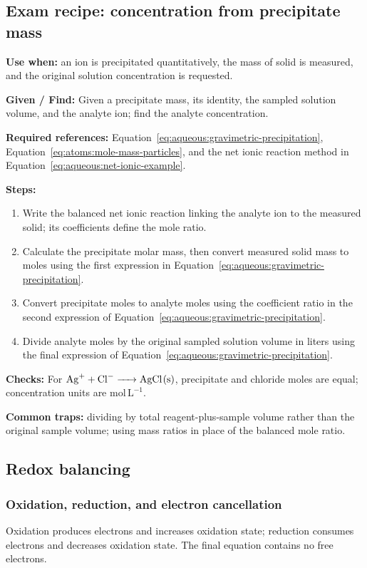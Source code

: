 \subsection{Exam recipe: concentration from precipitate mass}
\textbf{Use when:} an ion is precipitated quantitatively, the mass of solid is measured, and the original solution concentration is requested.

\textbf{Given / Find:} Given a precipitate mass, its identity, the sampled solution volume, and the analyte ion; find the analyte concentration.

\textbf{Required references:} Equation~\eqref{eq:aqueous:gravimetric-precipitation}, Equation~\eqref{eq:atoms:mole-mass-particles}, and the net ionic reaction method in Equation~\eqref{eq:aqueous:net-ionic-example}.


\textbf{Steps:}
\begin{enumerate}
    \item Write the balanced net ionic reaction linking the analyte ion to the measured solid; its coefficients define the mole ratio.
    \item Calculate the precipitate molar mass, then convert measured solid mass to moles using the first expression in Equation~\eqref{eq:aqueous:gravimetric-precipitation}.
    \item Convert precipitate moles to analyte moles using the coefficient ratio in the second expression of Equation~\eqref{eq:aqueous:gravimetric-precipitation}.
    \item Divide analyte moles by the original sampled solution volume in liters using the final expression of Equation~\eqref{eq:aqueous:gravimetric-precipitation}.
\end{enumerate}

\textbf{Checks:} For \(\ce{Ag+ + Cl- -> AgCl(s)}\), precipitate and chloride moles are equal; concentration units are \(\mathrm{mol\,L^{-1}}\).

\textbf{Common traps:} dividing by total reagent-plus-sample volume rather than the original sample volume; using mass ratios in place of the balanced mole ratio.

\subsection{Redox balancing}

\subsubsection{Oxidation, reduction, and electron cancellation}
Oxidation produces electrons and increases oxidation state; reduction consumes electrons and decreases oxidation state. The final equation contains no free electrons.

